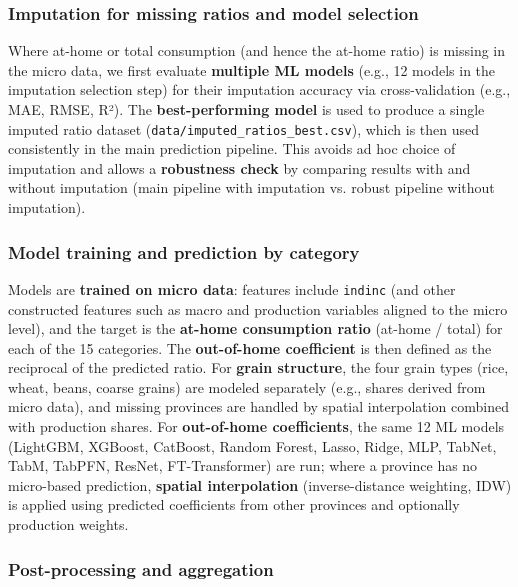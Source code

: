 \subsubsection{Imputation for missing ratios and model selection}
\label{subsec:imputation}

Where at-home or total consumption (and hence the at-home ratio) is missing in the micro data, we first evaluate \textbf{multiple ML models} (e.g., 12 models in the imputation selection step) for their imputation accuracy via cross-validation (e.g., MAE, RMSE, R²). The \textbf{best-performing model} is used to produce a single imputed ratio dataset (\texttt{data/imputed\_ratios\_best.csv}), which is then used consistently in the main prediction pipeline. This avoids ad hoc choice of imputation and allows a \textbf{robustness check} by comparing results with and without imputation (main pipeline with imputation vs. robust pipeline without imputation).

\subsubsection{Model training and prediction by category}
\label{subsec:training-prediction}

Models are \textbf{trained on micro data}: features include \texttt{indinc} (and other constructed features such as macro and production variables aligned to the micro level), and the target is the \textbf{at-home consumption ratio} (at-home / total) for each of the 15 categories. The \textbf{out-of-home coefficient} is then defined as the reciprocal of the predicted ratio. For \textbf{grain structure}, the four grain types (rice, wheat, beans, coarse grains) are modeled separately (e.g., shares derived from micro data), and missing provinces are handled by spatial interpolation combined with production shares. For \textbf{out-of-home coefficients}, the same 12 ML models (LightGBM, XGBoost, CatBoost, Random Forest, Lasso, Ridge, MLP, TabNet, TabM, TabPFN, ResNet, FT-Transformer) are run; where a province has no micro-based prediction, \textbf{spatial interpolation} (inverse-distance weighting, IDW) is applied using predicted coefficients from other provinces and optionally production weights.

\subsubsection{Post-processing and aggregation}
\label{subsec:postprocess}

